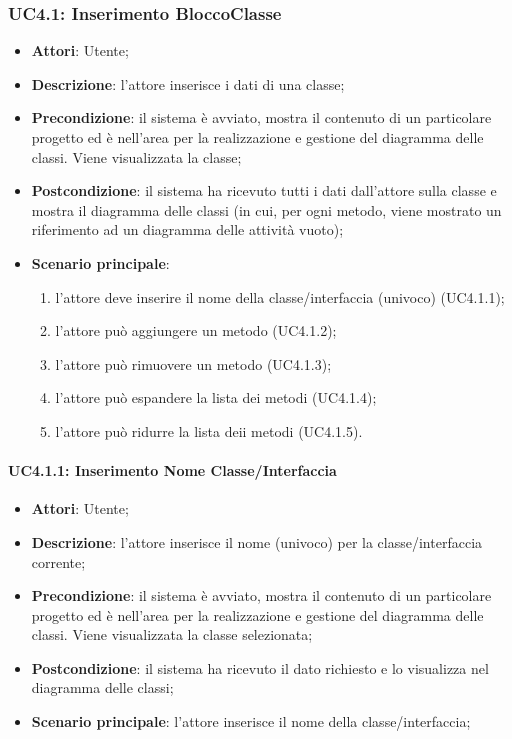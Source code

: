 \subsubsection{UC4.1: Inserimento BloccoClasse}
\label{UC4.1}
\begin{itemize}
	\item \textbf{Attori}: Utente;
	\item \textbf{Descrizione}: l'attore inserisce i dati di una classe;
	\item \textbf{Precondizione}: il sistema è avviato, mostra il contenuto di un particolare progetto ed è nell'area per la realizzazione e gestione del diagramma delle classi. Viene visualizzata la classe;
	\item \textbf{Postcondizione}: il sistema ha ricevuto tutti i dati dall'attore sulla classe e mostra il diagramma delle classi (in cui, per ogni metodo, viene mostrato un riferimento ad un diagramma delle attività vuoto);
	\item \textbf{Scenario principale}:
	\begin{enumerate}
		\item l'attore deve inserire il nome della classe/interfaccia (univoco) (UC4.1.1);
		\item l'attore può aggiungere un metodo (UC4.1.2);
		\item l'attore può rimuovere un metodo (UC4.1.3);
		\item l'attore può espandere la lista dei metodi (UC4.1.4);
		\item l'attore può ridurre la lista deii metodi (UC4.1.5).
	\end{enumerate}
\end{itemize}

\paragraph{UC4.1.1: Inserimento Nome Classe/Interfaccia}
\label{UC4.1.1}
\begin{itemize}
	\item \textbf{Attori}: Utente;
	\item \textbf{Descrizione}: l'attore inserisce il nome (univoco) per la classe/interfaccia corrente;
	\item \textbf{Precondizione}: il sistema è avviato, mostra il contenuto di un particolare progetto ed è nell'area per la realizzazione e gestione del diagramma delle classi. Viene visualizzata la classe selezionata;
	\item \textbf{Postcondizione}: il sistema ha ricevuto il dato richiesto e lo visualizza nel diagramma delle classi;
	\item \textbf{Scenario principale}: l'attore inserisce il nome della classe/interfaccia;
\end{itemize}

